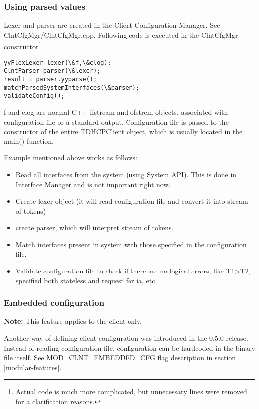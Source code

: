 \subsubsection{Using parsed values}

Lexer and parser are created in the Client Configuration Manager. See
ClntCfgMgr/ClntCfgMgr.cpp. Following code is executed in the ClntCfgMgr
constructor\footnote{Actual code is much more complicated, but
unnecessary lines were removed for a clarification reasons.}

\begin{verbatim}
yyFlexLexer lexer(\&f,\&clog);
ClntParser parser(\&lexer);
result = parser.yyparse();
matchParsedSystemInterfaces(\&parser);
validateConfig();
\end{verbatim}

f and clog are normal C++ ifstream and ofstrem objects, associated with
configuration file or a standard output. Configuration file is passed to
the constructor of the entire TDHCPClient object, which is usually
located in the main() function.

Example mentioned above works as follows:

\begin{itemize}
 \item Read all interfaces from the system (using System API). This is done in
       Interface Manager and is not important right now.
 \item Create lexer object (it will read configuration file and convert it into stream
       of tokens)
 \item create parser, which will interpret stream of tokens.
 \item Match interfaces present in system with those specified in the configuration
       file.
 \item Validate configuration file to check if there are no logical errors, like T1>T2,
       specified both stateless and request for ia, etc.
\end{itemize}

\subsubsection{Embedded configuration}

\textbf{Note:} This feature applies to the client only.

Another way of defining client configuration was introduced in the 0.5.0
release. Instead of reading configuration file, configuration can be
hardcoded in the binary file itself. See MOD\_CLNT\_EMBEDDED\_CFG flag
description in section \ref{modular-features}.

